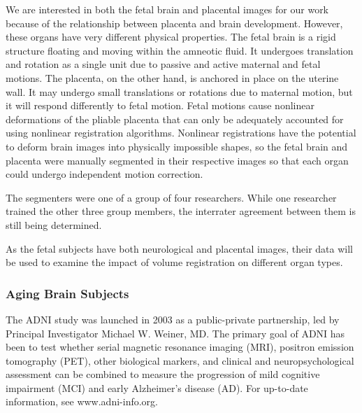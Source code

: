We are interested in both the fetal brain and placental images for our work because of the relationship between placenta and brain development. However, these organs have very different physical properties. The fetal brain is a rigid structure floating and moving within the amneotic fluid. It undergoes translation and rotation as a single unit due to passive and active maternal and fetal motions. The placenta, on the other hand, is anchored in place on the uterine wall. It may undergo small translations or rotations due to maternal motion, but it will respond differently to fetal motion. Fetal motions cause nonlinear deformations of the pliable placenta that can only be adequately accounted for using nonlinear registration algorithms. Nonlinear registrations have the potential to deform brain images into physically impossible shapes, so the fetal brain and placenta were manually segmented in their respective images so that each organ could undergo independent motion correction. 

The segmenters were one of a group of four researchers. While one researcher trained the other three group members, the interrater agreement between them is still being determined.

As the fetal subjects have both neurological and placental images, their data will be used to examine the impact of volume registration on different organ types.



\subsubsection{Aging Brain Subjects}

The ADNI study was launched in 2003 as a public-private partnership, led by Principal Investigator Michael W. Weiner, MD. The primary goal of ADNI has been to test whether serial magnetic resonance imaging (MRI), positron emission tomography (PET), other biological markers, and clinical and neuropsychological assessment can be combined to measure the progression of mild cognitive impairment (MCI) and early Alzheimer's disease (AD). For up-to-date information, see www.adni-info.org.

